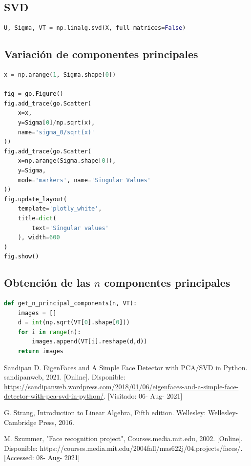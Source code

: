 \documentclass[conference]{IEEEtran}
\begin{document}
\subsection{SVD}
\begin{lstlisting}[language=Python]
U, Sigma, VT = np.linalg.svd(X, full_matrices=False) \end{lstlisting}

\subsection{Variación de componentes principales}
\begin{lstlisting}[language=python]
x = np.arange(1, Sigma.shape[0])

fig = go.Figure()
fig.add_trace(go.Scatter(
    x=x,
    y=Sigma[0]/np.sqrt(x),
    name='sigma_0/sqrt(x)'
))
fig.add_trace(go.Scatter(
    x=np.arange(Sigma.shape[0]),
    y=Sigma,
    mode='markers', name='Singular Values'
))
fig.update_layout(
    template='plotly_white',
    title=dict(
        text='Singular values'
    ), width=600
)
fig.show() \end{lstlisting}


\subsection{Obtención de las $n$ componentes principales}
\begin{lstlisting}[language=python]
def get_n_principal_components(n, VT):
    images = []
    d = int(np.sqrt(VT[0].shape[0]))
    for i in range(n):
        images.append(VT[i].reshape(d,d))
    return images \end{lstlisting}

\begin{thebibliography}{}

 Sandipan D. EigenFaces and A Simple Face Detector with PCA/SVD in Python. sandipanweb, 2021. [Online]. Disponible: \url{https://sandipanweb.wordpress.com/2018/01/06/eigenfaces-and-a-simple-face-detector-with-pca-svd-in-python/}. [Visitado: 06- Aug- 2021]

 G. Strang, Introduction to Linear Algebra, Fifth edition. Wellesley: Wellesley-Cambridge Press, 2016. 

 M. Szummer, "Face recognition project", Courses.media.mit.edu, 2002. [Online]. Disponible: https://courses.media.mit.edu/2004fall/mas622j/04.projects/faces/. [Accessed: 08- Aug- 2021]

\end{thebibliography}
\end{document}
